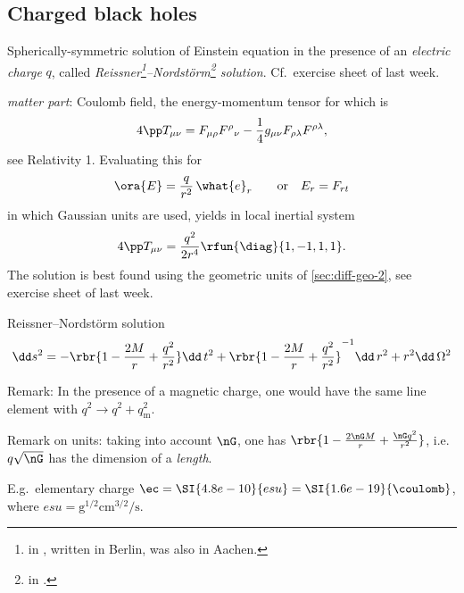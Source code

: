 \subsection{Charged black holes}

Spherically-symmetric solution of Einstein equation in the presence of an
\emph{electric charge} $q$, called \emph{Reissner\footnote{%
\citeauthor{Reissner1916} in \cite{Reissner1916}, written in
Berlin, was also in Aachen.}--Nordstörm\footnote{%
\citeauthor{nordstroem1918ander} in \cite{nordstroem1918ander}.} solution}.
Cf.\ exercise sheet of last week.

\emph{matter part}: Coulomb field, the energy-momentum tensor for which is
\begin{equation}
4\pp T_{\mu\nu} = F_{\mu\rho}F^\rho{}_\nu - \frac{1}{4} g_{\mu\nu}
F_{\rho\lambda} F^{\rho\lambda},
\end{equation}
see Relativity 1. Evaluating this for
\begin{equation}
\ora{E} = \frac{q}{r^2}\,\what{e}_r\qquad\text{or}\quad E_r = F_{rt}
\end{equation}
in which Gaussian units are used, yields in local inertial system
\begin{equation}
4\pp T_{\mu\nu} = \frac{q^2}{2r^4}\rfun{\diag}{1, -1, 1, 1}.
\end{equation}
The solution is best found using the geometric units of \cref{sec:diff-geo-2},
see exercise sheet of last week.


\begin{nameddef}{Reissner--Nordstörm solution}
\begin{equation}
\dd s^2 = -\rbr{1-\frac{2M}{r}+\frac{q^2}{r^2}}\dd\, t^2
+\rbr{1-\frac{2M}{r}+\frac{q^2}{r^2}}^{-1} \dd\, r^2 + r^2 \dd\, \Omega^2
\label{eq:RN-sol}
\end{equation}
\end{nameddef} %

Remark: In the presence of a magnetic charge, one would have the same line
element with $q^2 \to q^2 + q_\text{m}^2$.

Remark on units: taking into account $\nG$, one has $\rbr{1-\frac{2\nG M}{r}
+\frac{\nG q^2}{r^2}}$, i.e.\ $q\sqrt{\nG}$ has the dimension of a
\emph{length}.

E.g.\ elementary charge $\ec = \SI{4.8e-10}{esu} = \SI{1.6e-19}{\coulomb}$,
where $\si{esu} = \si{\gram^{1/2}\centi\metre^{3/2}\per\second}$.

